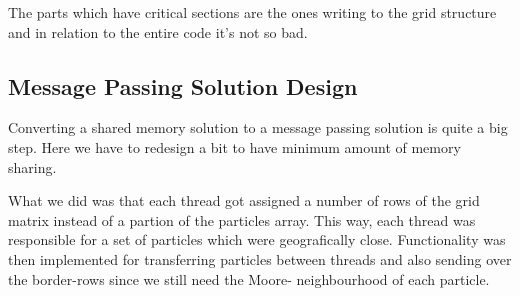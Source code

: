     The parts which have critical sections are the ones writing to the grid
    structure and in relation to the entire code it's not so bad.

    \subsection{Message Passing Solution Design}

    Converting a shared memory solution to a message passing solution is quite a
    big step. Here we have to redesign a bit to have minimum amount of memory
    sharing.

    What we did was that each thread got assigned a number of rows of the grid
    matrix instead of a partion of the particles array. This way, each thread
    was responsible for a set of particles which were geografically close.
    Functionality was then implemented for transferring particles between
    threads and also sending over the border-rows since we still need the Moore-
    neighbourhood of each particle.
